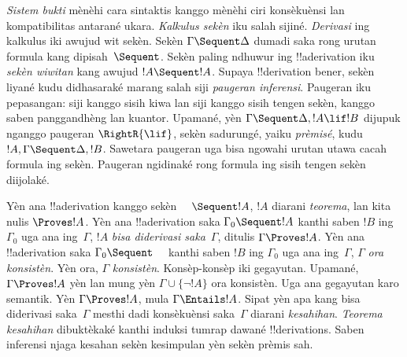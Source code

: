 \emph{Sistem bukti} mènèhi cara sintaktis kanggo mènèhi ciri
konsèkuènsi lan kompatibilitas antarané ukara. \emph{Kalkulus
sekèn} iku salah sijiné. \emph{Derivasi} ing kalkulus iki
awujud wit sekèn. Sekèn $\Gamma\Sequent\Delta$ dumadi saka
rong urutan formula kang dipisah~$\Sequent$. Sekèn paling
ndhuwur ing !!a{derivation} iku \emph{sekèn wiwitan} kang
awujud $!A\Sequent !A$. Supaya !!{derivation} bener, sekèn
liyané kudu didhasaraké marang salah siji \emph{paugeran
inferensi}. Paugeran iku pepasangan: siji kanggo sisih kiwa lan
siji kanggo sisih tengen sekèn, kanggo saben panggandhèng lan
kuantor. Upamané, yèn $\Gamma\Sequent\Delta,!A\lif !B$ dijupuk
nganggo paugeran $\RightR{\lif}$, sekèn sadurungé, yaiku
\emph{prèmisé}, kudu $!A,\Gamma\Sequent\Delta,!B$.
Sawetara paugeran uga bisa ngowahi urutan utawa cacah formula
ing sekèn. Paugeran \RightR{\Exchange} ngidinaké rong formula
ing sisih tengen sekèn diijolaké.

Yèn ana !!a{derivation} kanggo sekèn $\quad\Sequent !A$,
$!A$ diarani \emph{teorema}, lan kita nulis $\Proves !A$.
Yèn ana !!a{derivation} saka $\Gamma_0\Sequent !A$ kanthi
saben $!B$ ing $\Gamma_0$ uga ana ing~$\Gamma$, $!A$
\emph{bisa diderivasi saka}~$\Gamma$, ditulis $\Gamma\Proves !A$.
Yèn ana !!a{derivation} saka $\Gamma_0\Sequent\quad$ kanthi
saben $!B$ ing $\Gamma_0$ uga ana ing~$\Gamma$, $\Gamma$
\emph{ora konsistèn}. Yèn ora, $\Gamma$ \emph{konsistèn}.
Konsèp-konsèp iki gegayutan. Upamané, $\Gamma\Proves !A$
yèn lan mung yèn $\Gamma\cup\{\lnot !A\}$ ora konsistèn.
Uga ana gegayutan karo semantik. Yèn $\Gamma\Proves !A$,
mula $\Gamma\Entails !A$. Sipat yèn apa kang bisa diderivasi
saka~$\Gamma$ mesthi dadi konsèkuènsi saka~$\Gamma$ diarani
\emph{kesahihan}. \emph{Teorema kesahihan} dibuktèkaké kanthi
induksi tumrap dawané !!{derivation}s. Saben inferensi njaga
kesahan sekèn kesimpulan yèn sekèn prèmis sah.
